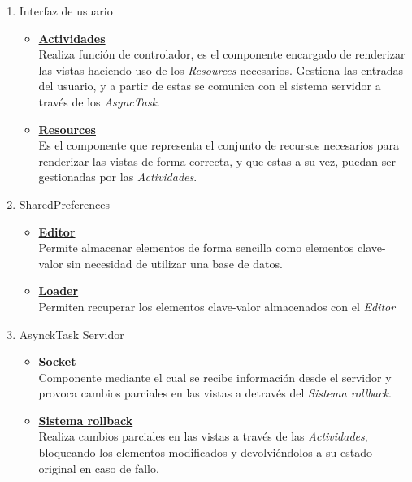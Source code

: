 \documentclass[12pt, twoside]{article}
\begin{document}
            \begin{enumerate}
                \item Interfaz de usuario
                    \begin{itemize}
                        \item \textbf{\underline{Actividades}} \\
                            Realiza función de controlador, es el componente encargado de renderizar las vistas haciendo uso de los \textit{Resources} necesarios. Gestiona las entradas del usuario, y a partir de estas se comunica con el sistema servidor a través de los \textit{AsyncTask}.
                        \item \textbf{\underline{Resources}} \\ 
                            Es el componente que representa el conjunto de recursos necesarios para renderizar las vistas de forma correcta, y que estas a su vez, puedan ser gestionadas por las \textit{Actividades}.
                    \end{itemize}
                \item SharedPreferences
                    \begin{itemize}
                        \item \textbf{\underline{Editor}} \\ 
                            Permite almacenar elementos de forma sencilla como elementos clave-valor sin necesidad de utilizar una base de datos.
                        \item \textbf{\underline{Loader}} \\
                            Permiten recuperar los elementos clave-valor almacenados con el \textit{Editor}
                    \end{itemize}
                \item AsynckTask Servidor
                    \begin{itemize}
                        \item \textbf{\underline{Socket}} \\ 
                            Componente mediante el cual se recibe información desde el servidor y provoca cambios parciales en las vistas a detravés del \textit{Sistema rollback}.
                        \item \textbf{\underline{Sistema rollback}} \\
                            Realiza cambios parciales en las vistas a través de las \textit{Actividades}, bloqueando los elementos modificados y devolviéndolos a su estado original en caso de fallo.

\end{itemize}
\end{enumerate}
\end{document}
